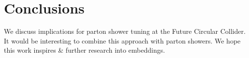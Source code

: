 \section{Conclusions}\label{sec:conclusions}

We discuss implications for parton shower tuning at the Future Circular
Collider. It would be interesting to combine this approach with parton
showers. We hope this work inspires & further research into embeddings.

